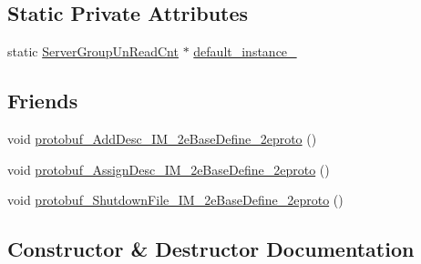\subsection*{Static Private Attributes}
\begin{DoxyCompactItemize}
\item 
static \hyperlink{class_i_m_1_1_base_define_1_1_server_group_un_read_cnt}{Server\+Group\+Un\+Read\+Cnt} $\ast$ \hyperlink{class_i_m_1_1_base_define_1_1_server_group_un_read_cnt_ad0e724d1734130a69b7778653ae0c94e}{default\+\_\+instance\+\_\+}
\end{DoxyCompactItemize}
\subsection*{Friends}
\begin{DoxyCompactItemize}
\item 
void \hyperlink{class_i_m_1_1_base_define_1_1_server_group_un_read_cnt_a9e69e602ccebaa03e642ca43da69b2eb}{protobuf\+\_\+\+Add\+Desc\+\_\+\+I\+M\+\_\+2e\+Base\+Define\+\_\+2eproto} ()
\item 
void \hyperlink{class_i_m_1_1_base_define_1_1_server_group_un_read_cnt_a2c5118df3e7622ff896b422106a76fef}{protobuf\+\_\+\+Assign\+Desc\+\_\+\+I\+M\+\_\+2e\+Base\+Define\+\_\+2eproto} ()
\item 
void \hyperlink{class_i_m_1_1_base_define_1_1_server_group_un_read_cnt_aa7f5f65378aed5daf4141184fe892bcf}{protobuf\+\_\+\+Shutdown\+File\+\_\+\+I\+M\+\_\+2e\+Base\+Define\+\_\+2eproto} ()
\end{DoxyCompactItemize}


\subsection{Constructor \& Destructor Documentation}
\hypertarget{class_i_m_1_1_base_define_1_1_server_group_un_read_cnt_acd69882c99e50f1815f7e08341a9ff64}{}
